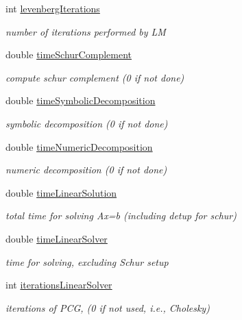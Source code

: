 \begin{DoxyCompactItemize}
int \hyperlink{structg2o_1_1G2OBatchStatistics_acd6b82e7401ec8c04e00b14bf76892a9}{levenberg\+Iterations}
\begin{DoxyCompactList}\small\item\em number of iterations performed by LM \end{DoxyCompactList}\item 
double \hyperlink{structg2o_1_1G2OBatchStatistics_a79d8935c9af46d716ef2b85b777fabe1}{time\+Schur\+Complement}
\begin{DoxyCompactList}\small\item\em compute schur complement (0 if not done) \end{DoxyCompactList}\item 
double \hyperlink{structg2o_1_1G2OBatchStatistics_a456a521ccb1e4c69940475a92a1f5d29}{time\+Symbolic\+Decomposition}
\begin{DoxyCompactList}\small\item\em symbolic decomposition (0 if not done) \end{DoxyCompactList}\item 
double \hyperlink{structg2o_1_1G2OBatchStatistics_a31f4a361dba1f3eb8dba2ca2aa326905}{time\+Numeric\+Decomposition}
\begin{DoxyCompactList}\small\item\em numeric decomposition (0 if not done) \end{DoxyCompactList}\item 
double \hyperlink{structg2o_1_1G2OBatchStatistics_a01fea9876aab94b1e69a6a03c20fd98f}{time\+Linear\+Solution}
\begin{DoxyCompactList}\small\item\em total time for solving Ax=b (including detup for schur) \end{DoxyCompactList}\item 
double \hyperlink{structg2o_1_1G2OBatchStatistics_adb423c3dac9262b7f4a315bbb108464a}{time\+Linear\+Solver}
\begin{DoxyCompactList}\small\item\em time for solving, excluding Schur setup \end{DoxyCompactList}\item 
int \hyperlink{structg2o_1_1G2OBatchStatistics_a0ef94423b56f6d842e33a7c277c930a0}{iterations\+Linear\+Solver}
\begin{DoxyCompactList}\small\item\em iterations of P\+CG, (0 if not used, i.\+e., Cholesky) \end{DoxyCompactList}\item 

\end{DoxyCompactItemize}
